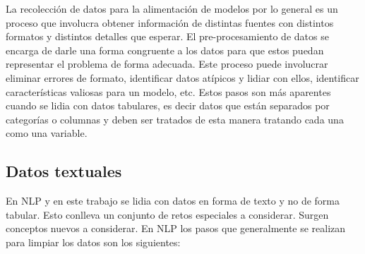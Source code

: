 La recolección de datos para la alimentación de modelos por lo general es un proceso que involucra obtener información de distintas fuentes con distintos formatos y distintos detalles que esperar. El pre-procesamiento de datos se encarga de darle una forma congruente a los datos para que estos puedan representar el problema de forma adecuada. Este proceso puede involucrar eliminar errores de formato, identificar datos atípicos y lidiar con ellos, identificar características valiosas para un modelo, etc. Estos pasos son más aparentes cuando se lidia con datos tabulares, es decir datos que están separados por categorías o columnas y deben ser tratados de esta manera tratando cada una como una variable.

\subsection{Datos textuales}

En NLP y en este trabajo se lidia con datos en forma de texto y no de forma tabular. Esto conlleva un conjunto de retos especiales a considerar. Surgen conceptos nuevos a considerar. En NLP los pasos que generalmente se realizan para limpiar los datos son los siguientes:

